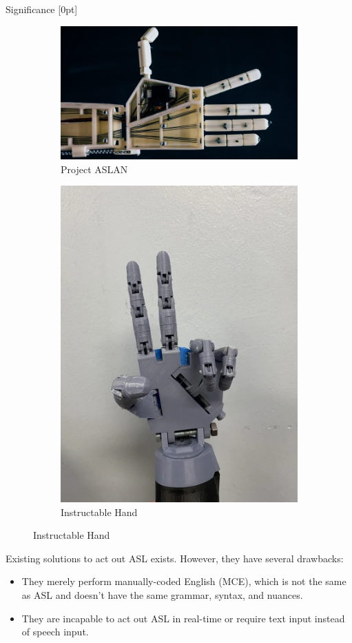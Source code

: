 \documentclass[final, 20pt]{beamer}
\newlength{\colwidth}
\begin{document}
\begin{frame}[t]
\begin{columns}[t]
\begin{column}{\colwidth}
      \begin{block}{Significance}
        [0pt]
        \vspace{1cm}
        \begin{figure}[ht]
          \centering
          \begin{subfigure}[b]{0.45\linewidth}
            \centering
            \includegraphics[width=\linewidth]{images/aslan.png}
            \caption{Project ASLAN}
            \label{fig:aslan}
          \end{subfigure}
          \begin{subfigure}[b]{0.45\linewidth}
            \centering
            \includegraphics[width=0.425\linewidth]{images/instructable-hand.png}
            \caption{Instructable Hand}
            \label{fig:instructable-hand}
          \end{subfigure}
        \end{figure}

        Existing solutions to act out ASL exists. However, they have several drawbacks:

        \begin{itemize}
          \item They merely perform manually-coded English (MCE), which is not the same as ASL and doesn't have the same grammar, syntax, and nuances.
          \item They are incapable to act out ASL in real-time or require text input instead of speech input.
        \end{itemize}


\end{block}
\end{column}
\end{columns}
\end{frame}
\end{document}
